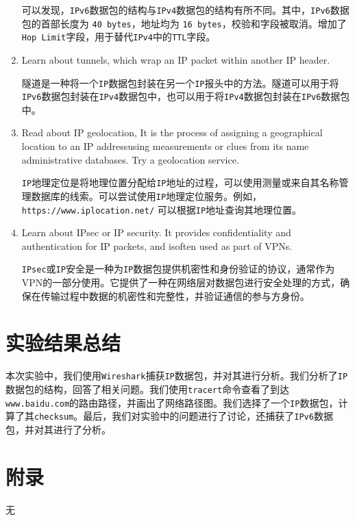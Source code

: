 \documentclass{article}
\begin{document}
\begin{enumerate}[noitemsep]
        可以发现，\texttt{IPv6}数据包的结构与\texttt{IPv4}数据包的结构有所不同。其中，\texttt{IPv6}数据包的首部长度为 \texttt{40 bytes}，地址均为 \texttt{16 bytes}，校验和字段被取消。增加了 \texttt{Hop Limit}字段，用于替代\texttt{IPv4}中的\texttt{TTL}字段。

  \item Learn about tunnels, which wrap an IP packet within another IP header.

        隧道是一种将一个\texttt{IP}数据包封装在另一个\texttt{IP}报头中的方法。隧道可以用于将\texttt{IPv6}数据包封装在\texttt{IPv4}数据包中，也可以用于将\texttt{IPv4}数据包封装在\texttt{IPv6}数据包中。

  \item Read about IP geolocation, It is the process of assigning a geographical location to an IP addressusing measurements or clues from its name administrative databases. Try a geolocation service.

        \texttt{IP}地理定位是将地理位置分配给\texttt{IP}地址的过程，可以使用测量或来自其名称管理数据库的线索。可以尝试使用\texttt{IP}地理定位服务。例如，\texttt{https://www.iplocation.net/} 可以根据\texttt{IP}地址查询其地理位置。

  \item Learn about IPsec or IP security. It provides confidentiality and authentication for IP packets, and isoften used as part of VPNs.

        \texttt{IPsec}或\texttt{IP}安全是一种为\texttt{IP}数据包提供机密性和身份验证的协议，通常作为VPN的一部分使用。它提供了一种在网络层对数据包进行安全处理的方式，确保在传输过程中数据的机密性和完整性，并验证通信的参与方身份。
\end{enumerate}

\section{实验结果总结}

本次实验中，我们使用\texttt{Wireshark}捕获\texttt{IP}数据包，并对其进行分析。我们分析了\texttt{IP}数据包的结构，回答了相关问题。我们使用\texttt{tracert}命令查看了到达\texttt{www.baidu.com}的路由路径，并画出了网络路径图。我们选择了一个\texttt{IP}数据包，计算了其\texttt{checksum}。最后，我们对实验中的问题进行了讨论，还捕获了\texttt{IPv6}数据包，并对其进行了分析。

\section{附录}

无
\end{document}

